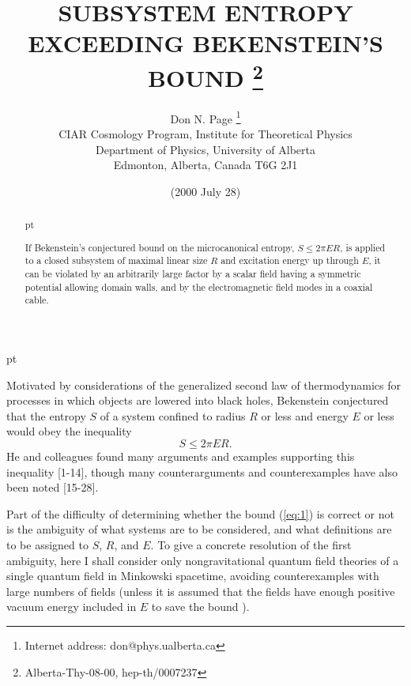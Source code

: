 \documentclass[a4paper,12pt]{article}
\begin{document}
\title{{\bf SUBSYSTEM ENTROPY
\\ EXCEEDING BEKENSTEIN'S BOUND}
\thanks{Alberta-Thy-08-00, hep-th/0007237}}
\author{
Don N. Page
\thanks{Internet address:
don@phys.ualberta.ca}
\\
CIAR Cosmology Program, Institute for Theoretical Physics\\
Department of Physics, University of Alberta\\
Edmonton, Alberta, Canada T6G 2J1
}
\date{(2000 July 28)}
\maketitle
\large

\begin{abstract}
 pt

	If Bekenstein's conjectured bound
on the microcanonical entropy,
$S \leq 2 \pi E R$,
is applied to a closed subsystem
of maximal linear size $R$
and excitation energy up through $E$,
it can be violated by an arbitrarily large factor
by a scalar field having a symmetric potential
allowing domain walls, and
by the electromagnetic field modes
in a coaxial cable.

\end{abstract}
\normalsize
{} pt
\newpage

	Motivated by considerations
of the generalized second law of thermodynamics
for processes in which objects are lowered into black holes,
Bekenstein
\cite{Bek1}
conjectured that the entropy $S$
of a system confined to radius $R$
or less and energy $E$ or less
would obey the inequality
 \begin{equation}
 S \leq 2 \pi E R.
 \label{eq:1}
 \end{equation}
He and colleagues found many arguments and examples
supporting this inequality
[1-14],
though many counterarguments and counterexamples
have also been noted
[15-28].

	Part of the difficulty of determining
whether the bound (\ref{eq:1}) is correct or not
is the ambiguity of what systems are to be considered,
and what definitions are to be assigned to $S$, $R$, and $E$.
To give a concrete resolution of the first ambiguity,
here I shall consider only nongravitational quantum field theories
of a single quantum field in Minkowski spacetime,
avoiding counterexamples with large numbers of fields
\cite{Page1,UW1,FMW}
(unless it is assumed that the fields have
enough positive vacuum energy included in $E$
to save the bound
\cite{Bek3,Bek6,Bek7}).
\end{document}
